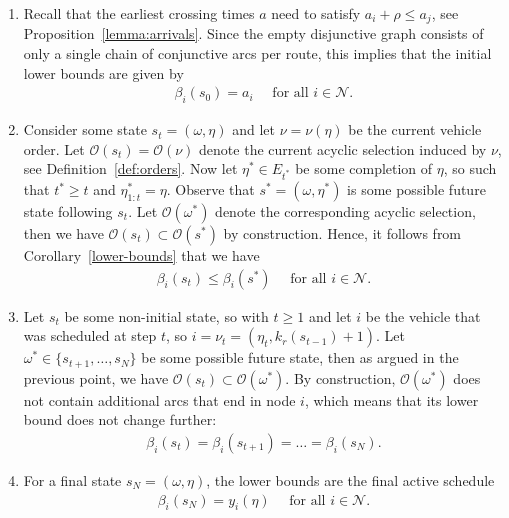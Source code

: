 \documentclass[a4paper]{report}
\theoremstyle{definition}
\theoremstyle{plain}
\begin{document}
\begin{enumerate}[label=(\roman*)\;\;,leftmargin=3.5em,midpenalty=5]
  \item Recall that the earliest crossing times $a$ need to satisfy $a_i + \rho \leq a_j$,
        see Proposition~\ref{lemma:arrivals}. Since the empty disjunctive graph consists of only
        a single chain of conjunctive arcs per route, this implies that the
        initial lower bounds are given by
        \begin{align}
          \beta_i(s_0) = a_i \quad \text{ for all } i \in \mathcal{N}.
        \end{align}

  \item Consider some state $s_t = (\omega, \eta)$ and let $\nu = \nu(\eta)$ be the
        current vehicle order. Let $\mathcal{O}(s_t) = \mathcal{O}(\nu)$ denote
        the current acyclic selection induced by $\nu$, see
        Definition~\ref{def:orders}.
        Now let $\eta^* \in E_{t^*}$ be some completion of $\eta$, so such that
        $t^* \geq t$ and $\eta^*_{1:t} = \eta$.
        Observe that $s^* = (\omega, \eta^*)$ is some possible future state following
        $s_t$. Let $\mathcal{O}(\omega^*)$ denote the corresponding acyclic
        selection, then we have $\mathcal{O}(s_t) \subset \mathcal{O}(s^*)$ by
        construction. Hence, it follows from Corollary~\ref{lower-bounds} that
        we have
        \begin{align}
          \beta_i(s_t) \leq \beta_i(s^*) \quad \text{ for all } i \in \mathcal{N} .
        \end{align}

  \item Let $s_t$ be some non-initial state, so with $t \geq 1$ and let $i$ be
        the vehicle that was scheduled at step $t$, so
        $i = \nu_t =  (\eta_t, k_r(s_{t-1}) + 1)$.
        Let $\omega^* \in \{s_{t+1}, \dots, s_N\}$ be some possible future state,
        then as argued in the previous point, we have
        $\mathcal{O}(s_t) \subset \mathcal{O}(\omega^*)$.
        By construction, $\mathcal{O}(\omega^*)$ does not contain additional arcs
        that end in node $i$, which means that its lower bound does not change
        further:
        \begin{align}
          \beta_i(s_t) = \beta_{i}(s_{t+1}) = \dots = \beta_i(s_N) .
        \end{align}

  \item For a final state $s_N = (\omega, \eta)$, the lower bounds are the final
        active schedule
        \begin{align*}
          \beta_i(s_N) = y_i(\eta) \quad \text{ for all } i \in \mathcal{N}.
        \end{align*}

\end{enumerate}
\end{document}
